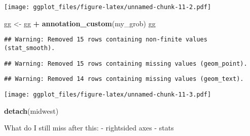 \documentclass[]{article}
\newenvironment{Shaded}{\begin{snugshade}}{\end{snugshade}}
\newcommand{\KeywordTok}[1]{\textcolor[rgb]{0.13,0.29,0.53}{\textbf{#1}}}
\newcommand{\StringTok}[1]{\textcolor[rgb]{0.31,0.60,0.02}{#1}}
\newcommand{\OperatorTok}[1]{\textcolor[rgb]{0.81,0.36,0.00}{\textbf{#1}}}
\newcommand{\NormalTok}[1]{#1}
\begin{document}
\texttt{[image: ggplot\_files/figure-latex/unnamed-chunk-11-2.pdf]}

\begin{Shaded}
\begin{Highlighting}[]
\NormalTok{gg <-}\StringTok{ }\NormalTok{gg }\OperatorTok{+}\StringTok{ }\KeywordTok{annotation_custom}\NormalTok{(my_grob)}
\NormalTok{gg}
\end{Highlighting}
\end{Shaded}

\begin{verbatim}
## Warning: Removed 15 rows containing non-finite values (stat_smooth).
\end{verbatim}

\begin{verbatim}
## Warning: Removed 15 rows containing missing values (geom_point).
\end{verbatim}

\begin{verbatim}
## Warning: Removed 14 rows containing missing values (geom_text).
\end{verbatim}

\texttt{[image: ggplot\_files/figure-latex/unnamed-chunk-11-3.pdf]}

\begin{Shaded}
\begin{Highlighting}[]
\KeywordTok{detach}\NormalTok{(midwest)}
\end{Highlighting}
\end{Shaded}

What do I still miss after this: - rightsided axes - stats
\end{document}
